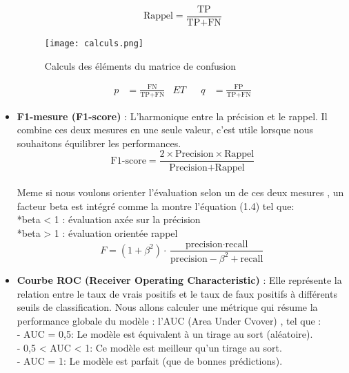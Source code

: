 \begin{itemize}[label=$\bullet$]
\begin{equation}
\text{Rappel} = \frac{\text{TP}}{\text{TP} + \text{FN}}
\end{equation}
    \begin{figure}[htbp]
    \centering
    \texttt{[image: calculs.png]}
    \caption{Calculs des éléments du matrice de confusion\cite{classification_metrics_matrice_de_confusion}}
    \label{fig:example23}
    \end{figure}
\begin{align*}
p &= \frac{\text{FN}}{\text{TP} + \text{FN}} & ET&&
q &= \frac{\text{FP}}{\text{TP} + \text{FN}}
\end{align*}



\item \textbf{F1-mesure (F1-score)} : L’harmonique entre la précision et le rappel. Il combine ces deux mesures en une seule valeur, c'est utile lorsque nous souhaitons équilibrer les performances.
\begin{equation}
\text{F1-score} = \frac{2 \times \text{Precision} \times \text{Rappel}}{\text{Precision} + \text{Rappel}}
\end{equation} \\
Meme si nous voulons orienter l'évaluation selon un de ces deux mesures , un facteur beta est intégré comme la montre l'équation (1.4) tel que:\\ *beta < 1 : évaluation axée sur la précision\\
*beta > 1 : évaluation orientée rappel\\
\begin{equation}
F = (1 + \beta^2) \cdot \frac{\text{precision} \cdot \text{recall}}{\text{precision} - \beta^2 + \text{recall}}
\end{equation}

\item \textbf{Courbe ROC (Receiver Operating Characteristic)} : Elle représente la relation entre le taux de vrais positifs et le taux de faux positifs à différents seuils de classification. Nous allons calculer une métrique qui résume la performance globale du modèle : l’AUC (Area Under Cvover) , tel que : \\

- AUC = 0,5: Le modèle est équivalent à un tirage au sort (aléatoire). \\
- 0,5 < AUC < 1: Ce modèle est meilleur qu'un tirage au sort. \\
- AUC = 1: Le modèle est parfait (que de bonnes prédictions).


\end{itemize}
